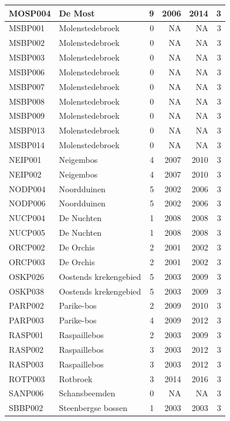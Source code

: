 \documentclass[11pt,]{book}
\begin{document}
\begin{table}
\begin{tabular}[t]{l|l|r|r|r|r}
\hline
MOSP004 & De Most & 9 & 2006 & 2014 & 3\\
\hline
MSBP001 & Molenstedebroek & 0 & NA & NA & 3\\
\hline
MSBP002 & Molenstedebroek & 0 & NA & NA & 3\\
\hline
MSBP003 & Molenstedebroek & 0 & NA & NA & 3\\
\hline
MSBP006 & Molenstedebroek & 0 & NA & NA & 3\\
\hline
MSBP007 & Molenstedebroek & 0 & NA & NA & 3\\
\hline
MSBP008 & Molenstedebroek & 0 & NA & NA & 3\\
\hline
MSBP009 & Molenstedebroek & 0 & NA & NA & 3\\
\hline
MSBP013 & Molenstedebroek & 0 & NA & NA & 3\\
\hline
MSBP014 & Molenstedebroek & 0 & NA & NA & 3\\
\hline
NEIP001 & Neigembos & 4 & 2007 & 2010 & 3\\
\hline
NEIP002 & Neigembos & 4 & 2007 & 2010 & 3\\
\hline
NODP004 & Noordduinen & 5 & 2002 & 2006 & 3\\
\hline
NODP006 & Noordduinen & 5 & 2002 & 2006 & 3\\
\hline
NUCP004 & De Nuchten & 1 & 2008 & 2008 & 3\\
\hline
NUCP005 & De Nuchten & 1 & 2008 & 2008 & 3\\
\hline
ORCP002 & De Orchis & 2 & 2001 & 2002 & 3\\
\hline
ORCP003 & De Orchis & 2 & 2001 & 2002 & 3\\
\hline
OSKP026 & Oostends krekengebied & 5 & 2003 & 2009 & 3\\
\hline
OSKP038 & Oostends krekengebied & 5 & 2003 & 2009 & 3\\
\hline
PARP002 & Parike-bos & 2 & 2009 & 2010 & 3\\
\hline
PARP003 & Parike-bos & 4 & 2009 & 2012 & 3\\
\hline
RASP001 & Raspaillebos & 2 & 2003 & 2009 & 3\\
\hline
RASP002 & Raspaillebos & 3 & 2003 & 2012 & 3\\
\hline
RASP003 & Raspaillebos & 3 & 2003 & 2012 & 3\\
\hline
ROTP003 & Rotbroek & 3 & 2014 & 2016 & 3\\
\hline
SANP006 & Schansbeemden & 0 & NA & NA & 3\\
\hline
SBBP002 & Steenbergse bossen & 1 & 2003 & 2003 & 3\\

\end{tabular}
\end{table}
\end{document}

